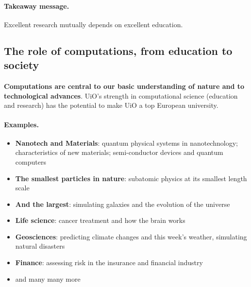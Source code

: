 \documentclass[%
twoside,                 %
final,                   %
10pt]{article}
\begin{document}
\noindent



\paragraph{Takeaway message.}
Excellent research mutually depends on excellent education.



\subsection{The role of computations, from education to society}

\paragraph{}
\textbf{Computations are central to our 
basic understanding of nature and to technological advances}.
UiO's strength in computational science (education and research)
has the potential to make UiO a top European university.




\paragraph{Examples.}
\begin{itemize}
\item \textbf{Nanotech and Materials}: quantum physical systems in nanotechnology; characteristics of new materials; semi-conductor devices and quantum computers

\item \textbf{The smallest particles in nature}: subatomic physics at its smallest length scale

\item \textbf{And the largest}: simulating galaxies and the evolution of the universe

\item \textbf{Life science}: cancer treatment and how the brain works

\item \textbf{Geosciences}: predicting climate changes and this week's weather, simulating natural disasters

\item \textbf{Finance}: assessing risk in the insurance and financial industry

\item and many many more
\end{itemize}
\end{document}
